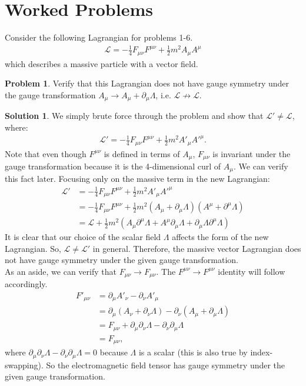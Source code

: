 \documentclass[a4paper,11pt]{article}
\numberwithin{equation}{section}
\theoremstyle{definition}
\newtheorem{prob}{Problem}[section]
\newtheorem{sln}{Solution}[section]
\newcommand{\p}{\partial}
\newcommand{\lag}{\mathcal{L}}
\begin{document}
\section{Worked Problems}
Consider the following Lagrangian for problems 1-6.
\begin{align}
\lag = -\frac{1}{4}F_{\mu\nu}F^{\mu\nu} + \frac{1}{2}m^2 A_\mu A^\mu
\end{align}
which describes a massive particle with a vector field.\\
\begin{prob}
	Verify that this Lagrangian does not have gauge symmetry under the gauge transformation $A_\mu \to A_\mu +\p_\mu \Lambda$, i.e. $\lag \not\to \lag$.\\
	\begin{sln}
		We simply brute force through the problem and show that $\lag' \neq \lag$, where:
		\begin{align}
		\lag' = -\frac{1}{4}F_{\mu\nu}F^{\mu\nu} + \frac{1}{2}m^2 A'_\mu A'^\mu.
		\end{align}
		Note that even though $F^{\mu\nu}$ is defined in terms of $A_\mu$, $F_{\mu\nu}$ is invariant under the gauge transformation because it is the 4-dimensional curl of $A_\mu$. We can verify this fact later. Focusing only on the massive term in the new Lagrangian:
		\begin{align}
		\lag' &= -\frac{1}{4}F_{\mu\nu}F^{\mu\nu} + \frac{1}{2}m^2 A'_\mu A'^\mu\\
		&= -\frac{1}{4}F_{\mu\nu}F^{\mu\nu} +\frac{1}{2}m^2(A_\mu + \p_\mu \Lambda)(A^\mu + \p^\mu \Lambda)\\
		&= \lag + \frac{1}{2}m^2(A_\mu \p^\mu\Lambda + A^\mu \p_\mu \Lambda + \p_\mu\Lambda \p^\mu \Lambda)
		\end{align}
		It is clear that our choice of the scalar field $\Lambda$ affects the form of the new Lagrangian. So, $\lag \neq \lag'$ in general. Therefore, the massive vector Lagrangian does not have gauge symmetry under the given gauge transformation.\\
		
		As an aside, we can verify that $F_{\mu\nu}\to F_{\mu\nu}$. The $F^{\mu\nu} \to F^{\mu\nu}$ identity will follow accordingly. 
		\begin{align}
		F'_{\mu\nu} &= \p_\mu A'_\nu - \p_\nu A'_\mu\\
		&= \p_\mu(A_\nu + \p_\nu\Lambda) - \p_\nu(A_\mu + \p_\mu\Lambda)\\
		&= F_{\mu\nu} + \p_\mu \p_\nu \Lambda - \p_\nu \p_\mu\Lambda\\
		&= F_{\mu\nu},
		\end{align}
		where $\p_\mu \p_\nu \Lambda - \p_\nu \p_\mu\Lambda=0$ because $\Lambda$ is a scalar (this is also true by index-swapping). So the electromagnetic field tensor has gauge symmetry under the given gauge transformation. \\
	\end{sln}
\end{prob}
\end{document}
